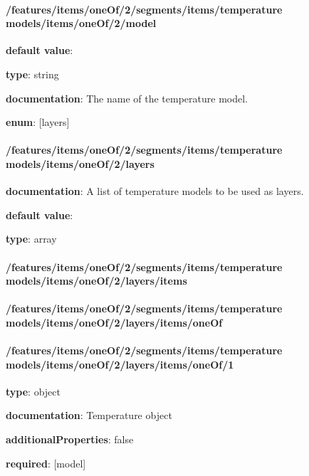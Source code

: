 \paragraph{/features/items/oneOf/2/segments/items/temperature models/items/oneOf/2/model} \begin{itemized}
\item {\bf default value}: 
\item {\bf type}: string
\item {\bf documentation}: The name of the temperature model.
\item {\bf enum}: [layers]\end{itemized}\paragraph{/features/items/oneOf/2/segments/items/temperature models/items/oneOf/2/layers} \begin{itemized}
\item {\bf documentation}: A list of temperature models to be used as layers.
\item {\bf default value}: 
\item {\bf type}: array
\paragraph{/features/items/oneOf/2/segments/items/temperature models/items/oneOf/2/layers/items} \begin{itemized}
\end{itemized}\end{itemized}\paragraph{/features/items/oneOf/2/segments/items/temperature models/items/oneOf/2/layers/items/oneOf} \begin{itemized}
\end{itemized}\paragraph{/features/items/oneOf/2/segments/items/temperature models/items/oneOf/2/layers/items/oneOf/1} \begin{itemized}
\item {\bf type}: object
\item {\bf documentation}: Temperature object
\item {\bf additionalProperties}: false
\item {\bf required}: [model]\end{itemized}
